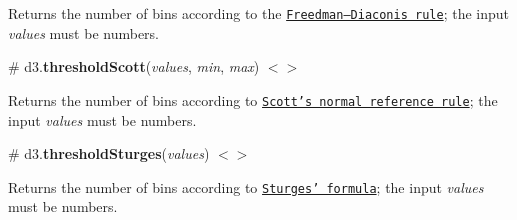 Returns the number of bins according to the \href{https://en.wikipedia.org/wiki/Histogram#Mathematical_definition}{\tt Freedman–\+Diaconis rule}; the input {\itshape values} must be numbers.

\label{_thresholdScott}%
\# d3.{\bfseries threshold\+Scott}({\itshape values}, {\itshape min}, {\itshape max}) \href{https://github.com/d3/d3-array/blob/master/src/threshold/scott.js}{\tt $<$$>$}

Returns the number of bins according to \href{https://en.wikipedia.org/wiki/Histogram#Mathematical_definition}{\tt Scott’s normal reference rule}; the input {\itshape values} must be numbers.

\label{_thresholdSturges}%
\# d3.{\bfseries threshold\+Sturges}({\itshape values}) \href{https://github.com/d3/d3-array/blob/master/src/threshold/sturges.js}{\tt $<$$>$}

Returns the number of bins according to \href{https://en.wikipedia.org/wiki/Histogram#Mathematical_definition}{\tt Sturges’ formula}; the input {\itshape values} must be numbers. 